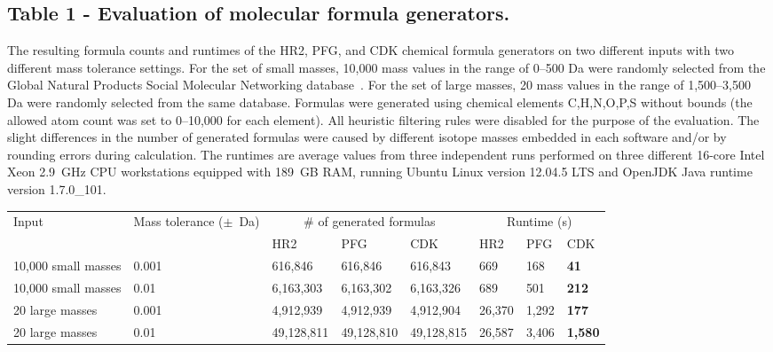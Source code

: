 \documentclass[doublespacing]{bmcart}
\begin{document}
\begin{backmatter}
  \subsection*{Table 1 - Evaluation of molecular formula generators.}
  \label{tab:formula_generators}
  The resulting formula counts and runtimes of the HR2, PFG, and CDK chemical
formula generators on two different inputs with two different mass tolerance
settings. For the set of small masses, 10,000 mass values in the range of
0--500 Da were randomly selected from the Global Natural Products Social
Molecular Networking database~\cite{wang2016}. For the set of large masses, 20
mass values in the range of 1,500--3,500 Da were randomly selected from the same
database. Formulas were generated using chemical elements C,H,N,O,P,S without
bounds (the allowed atom count was set to 0--10,000 for each element). All
heuristic filtering rules were disabled for the purpose of the evaluation. The
slight differences in the number of generated formulas were caused by different
isotope masses embedded in each software and/or by rounding errors during
calculation. The runtimes are average values from three independent runs
performed on three different 16-core Intel Xeon 2.9~GHz CPU workstations
equipped with 189~GB RAM, running Ubuntu Linux version 12.04.5 LTS and OpenJDK
Java runtime version 1.7.0\_101.
  \baselineskip

    \begin{minipage}{1\textwidth}
    \centering
    \begin{tabular}{llllllll}
	\multirow{2}{1in}{Input} & \multirow{2}{1in}{Mass tolerance ($\pm$~Da)} & \multicolumn{3}{c}{\# of generated formulas} & \multicolumn{3}{c}{Runtime (s)} \\
	& & HR2 & PFG & CDK & HR2 & PFG & CDK \\
	10,000 small masses & 0.001 & 616,846 & 616,846 & 616,843 & 669 & 168 & \textbf{41} \\
	10,000 small masses & 0.01 & 6,163,303 & 6,163,302 & 6,163,326 & 689 & 501 & \textbf{212} \\
	20 large masses & 0.001 & 4,912,939 & 4,912,939 & 4,912,904 & 26,370 & 1,292 & \textbf{177} \\
	20 large masses & 0.01 & 49,128,811 & 49,128,810 & 49,128,815 & 26,587 & 3,406 & \textbf{1,580} \\
    \end{tabular}
    \end{minipage}


\end{backmatter}
\end{document}
